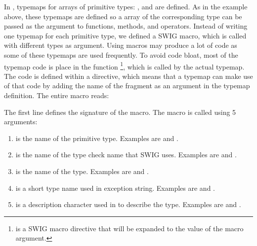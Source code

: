 In , typemaps for arrays of primitive types:
,  and  are defined.  As in the
 example above, these typemaps are defined so a \numpy
array of the corresponding type can be passed as the argument to
functions, methods, and operators.  Instead of writing one typemap for
each primitive type, we defined a SWIG macro, which is called with
different types as argument. Using macros may produce a lot of code as
some of these typemaps are used frequently. To avoid code bloat, most
of the typemap code is place in the function
\-\footnote{ is a SWIG macro directive that will be expanded
  to the value of the  macro argument.}, which is
called by the actual typemap. The code is defined within a
 directive, which means that a typemap can make use of
that code by adding the name of the fragment as an argument in the
typemap definition. The entire macro reads:
The first line defines the signature of the macro. The macro is called
using 5 arguments:
\begin{enumerate}
\item {} is the name of the primitive type. Examples are
 and .

\item {} is the name of the type check name that SWIG uses. Examples
are  and .

\item {} is the name of the \numpy type. Examples are
 and .

\item {} is a short type name used in exception string.
Examples are  and .

\item {} is a description character used in \numpy to describe the
type. Examples are  and .
\end{enumerate}
